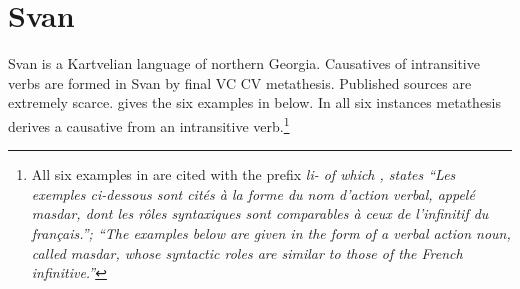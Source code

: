 \section{Svan}\label{sec:Sva}
Svan is a Kartvelian language of northern Georgia.
Causatives of intransitive verbs are formed in Svan by final VC {\ra} CV metathesis.
Published sources are extremely scarce.
\citet[297]{me97} gives the six examples in  below.
In all six instances metathesis derives a causative from an intransitive verb.\footnote{
		All six examples in  are cited with the prefix \it{li-} of which 
		\citet{me97}, states ``Les exemples ci-dessous sont cités à la forme du nom d’action verbal,
		appelé \emph{masdar}, dont les rôles syntaxiques sont comparables à ceux de l'infinitif du français.'';
		``The examples below are given in the form of a verbal action noun,
		called \emph{masdar}, whose syntactic roles are similar to those of the French infinitive.''}

\begin{exe}
	\label{ex:SvaMet}
\end{exe}
